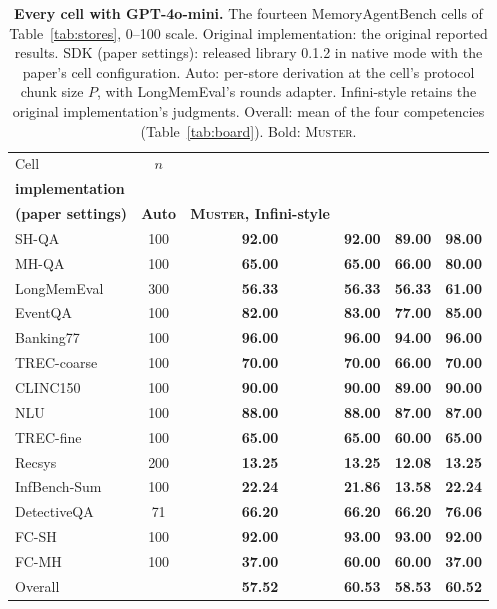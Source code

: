 \documentclass{article}
\newcommand{\tabfont}{\fontsize{7.5}{8.5}\selectfont\renewcommand{\arraystretch}{1.0}}
\newcommand{\sys}{\textsc{Muster}}
\begin{document}
\begin{table}[!htbp]
\centering\tabfont
\caption{\textbf{Every cell with GPT-4o-mini.} The fourteen MemoryAgentBench cells of Table~\ref{tab:stores}, 0--100 scale. Original implementation: the original reported results. SDK (paper settings): released library 0.1.2 in native mode with the paper's cell configuration. Auto: per-store derivation at the cell's protocol chunk size $P$, with LongMemEval's rounds adapter. Infini-style retains the original implementation's judgments. Overall: mean of the four competencies (Table~\ref{tab:board}). Bold: \sys{}.}
\label{tab:expanded4o-mini}
\setlength{\tabcolsep}{4pt}\setlength{\aboverulesep}{0pt}\setlength{\belowrulesep}{0pt}\setlength{\extrarowheight}{0.8pt}
\begin{tabular}{lc>{\columncolor{oursbg}}c>{\columncolor{oursbg}}c>{\columncolor{oursbg}}c>{\columncolor{oursbg}}c}
\toprule
Cell & $n$ & \shortstack{\textbf{Original}\\\textbf{implementation}} & \shortstack{\textbf{SDK}\\\textbf{(paper settings)}} & \textbf{Auto} & \textbf{\sys{}, Infini-style} \\
\midrule
SH-QA & 100 & \textbf{92.00} & \textbf{92.00} & \textbf{89.00} & \textbf{98.00} \\
MH-QA & 100 & \textbf{65.00} & \textbf{65.00} & \textbf{66.00} & \textbf{80.00} \\
LongMemEval & 300 & \textbf{56.33} & \textbf{56.33} & \textbf{56.33} & \textbf{61.00} \\
EventQA & 100 & \textbf{82.00} & \textbf{83.00} & \textbf{77.00} & \textbf{85.00} \\
Banking77 & 100 & \textbf{96.00} & \textbf{96.00} & \textbf{94.00} & \textbf{96.00} \\
TREC-coarse & 100 & \textbf{70.00} & \textbf{70.00} & \textbf{66.00} & \textbf{70.00} \\
CLINC150 & 100 & \textbf{90.00} & \textbf{90.00} & \textbf{89.00} & \textbf{90.00} \\
NLU & 100 & \textbf{88.00} & \textbf{88.00} & \textbf{87.00} & \textbf{87.00} \\
TREC-fine & 100 & \textbf{65.00} & \textbf{65.00} & \textbf{60.00} & \textbf{65.00} \\
Recsys & 200 & \textbf{13.25} & \textbf{13.25} & \textbf{12.08} & \textbf{13.25} \\
InfBench-Sum & 100 & \textbf{22.24} & \textbf{21.86} & \textbf{13.58} & \textbf{22.24} \\
DetectiveQA & 71 & \textbf{66.20} & \textbf{66.20} & \textbf{66.20} & \textbf{76.06} \\
FC-SH & 100 & \textbf{92.00} & \textbf{93.00} & \textbf{93.00} & \textbf{92.00} \\
FC-MH & 100 & \textbf{37.00} & \textbf{60.00} & \textbf{60.00} & \textbf{37.00} \\
\midrule
Overall &  & \textbf{57.52} & \textbf{60.53} & \textbf{58.53} & \textbf{60.52} \\
\bottomrule
\end{tabular}
\end{table}
\end{document}
